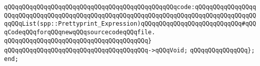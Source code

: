 \verb|qQQqqQQqqQQqqQQqqQQqqQQqqQQqqQQqqQQqqQQqqQQqqQQqcode:qQQqqQQqqQQqqQQqqQQqqQQqqQQqqQQqqQQqqQQqqQQqqQQqqQQqqQQqqQQqqQQqqQQqqQQqqQQqqQQqqQQqqQQqqQQqList(spp::Prettyprint_Expression)qQQqqQQqqQQqqQQqqQQqqQQqqQQq#qQQqCodeqQQqforqQQqnewqQQqsourcecodeqQQqfile.|\newline
\verb|qQQqqQQqqQQqqQQqqQQqqQQqqQQqqQQqqQQqqQQq}|\newline
\verb|qQQqqQQqqQQqqQQqqQQqqQQqqQQqqQQqqQQqqQQq->qQQqVoid;|\newline
\verb|qQQqqQQqqQQqqQQq};|\newline
\verb|end;|\newline

